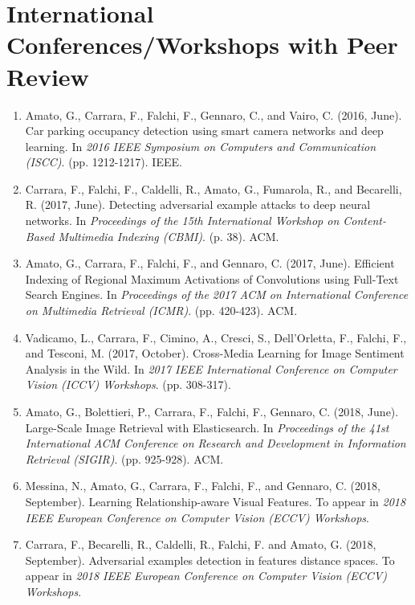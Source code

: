 \section*{International Conferences/Workshops with Peer Review}
\begin{enumerate}
    \item Amato, G., Carrara, F., Falchi, F., Gennaro, C., and Vairo, C. (2016, June). Car parking occupancy detection using smart camera networks and deep learning. In \emph{2016 IEEE Symposium on Computers and Communication (ISCC)}. (pp. 1212-1217). IEEE.
    \item Carrara, F., Falchi, F., Caldelli, R., Amato, G., Fumarola, R., and Becarelli, R. (2017, June). Detecting adversarial example attacks to deep neural networks. In \emph{Proceedings of the 15th International Workshop on Content-Based Multimedia Indexing (CBMI)}. (p. 38). ACM.
    \item Amato, G., Carrara, F., Falchi, F., and Gennaro, C. (2017, June). Efficient Indexing of Regional Maximum Activations of Convolutions using Full-Text Search Engines. In \emph{Proceedings of the 2017 ACM on International Conference on Multimedia Retrieval (ICMR)}. (pp. 420-423). ACM.
    \item Vadicamo, L., Carrara, F., Cimino, A., Cresci, S., Dell’Orletta, F., Falchi, F., and Tesconi, M. (2017, October). Cross-Media Learning for Image Sentiment Analysis in the Wild. In \emph{2017 IEEE International Conference on Computer Vision (ICCV) Workshops}. (pp. 308-317).
    \item Amato, G., Bolettieri, P., Carrara, F., Falchi, F., Gennaro, C. (2018, June). Large-Scale Image Retrieval with Elasticsearch. In \emph{Proceedings of the 41st International ACM Conference on Research and Development in Information Retrieval (SIGIR)}. (pp.  925-928). ACM.
    \item Messina, N., Amato, G., Carrara, F., Falchi, F., and Gennaro, C. (2018, September). Learning Relationship-aware Visual Features. To appear in \emph{2018 IEEE European Conference on Computer Vision (ECCV) Workshops}.
    \item Carrara, F., Becarelli, R., Caldelli, R., Falchi, F. and Amato, G. (2018, September). Adversarial examples detection in features distance spaces. To appear in \emph{2018 IEEE European Conference on Computer Vision (ECCV) Workshops}.
\end{enumerate}


